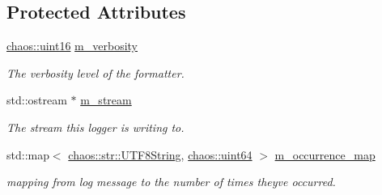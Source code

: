 \subsection*{Protected Attributes}
\begin{DoxyCompactItemize}
\item 
\hypertarget{classchaos_1_1test_1_1log__formatter_1_1_abstract_test_log_formatter_a75e69ea1b26afaceb31c579fb2fcc2f4}{}\hyperlink{namespacechaos_ac3888b1c9e56da7fbbdb3ab8425b4068}{chaos\+::uint16} \hyperlink{classchaos_1_1test_1_1log__formatter_1_1_abstract_test_log_formatter_a75e69ea1b26afaceb31c579fb2fcc2f4}{m\+\_\+verbosity}\label{classchaos_1_1test_1_1log__formatter_1_1_abstract_test_log_formatter_a75e69ea1b26afaceb31c579fb2fcc2f4}

\begin{DoxyCompactList}\small\item\em The verbosity level of the formatter. \end{DoxyCompactList}\item 
\hypertarget{classchaos_1_1test_1_1log__formatter_1_1_abstract_test_log_formatter_a39664df72c625247706e85fe7a7d3272}{}std\+::ostream $\ast$ \hyperlink{classchaos_1_1test_1_1log__formatter_1_1_abstract_test_log_formatter_a39664df72c625247706e85fe7a7d3272}{m\+\_\+stream}\label{classchaos_1_1test_1_1log__formatter_1_1_abstract_test_log_formatter_a39664df72c625247706e85fe7a7d3272}

\begin{DoxyCompactList}\small\item\em The stream this logger is writing to. \end{DoxyCompactList}\item 
\hypertarget{classchaos_1_1test_1_1log__formatter_1_1_abstract_test_log_formatter_aa78456083c88a8573e253611e9b42c37}{}std\+::map$<$ \hyperlink{classchaos_1_1str_1_1_u_t_f8_string}{chaos\+::str\+::\+U\+T\+F8\+String}, \hyperlink{namespacechaos_a34fe5f5bfc3ef6d80b5d094ed91b4d6e}{chaos\+::uint64} $>$ \hyperlink{classchaos_1_1test_1_1log__formatter_1_1_abstract_test_log_formatter_aa78456083c88a8573e253611e9b42c37}{m\+\_\+occurrence\+\_\+map}\label{classchaos_1_1test_1_1log__formatter_1_1_abstract_test_log_formatter_aa78456083c88a8573e253611e9b42c37}

\begin{DoxyCompactList}\small\item\em mapping from log message to the number of times they\textquotesingle{}ve occurred. \end{DoxyCompactList}\end{DoxyCompactItemize}


